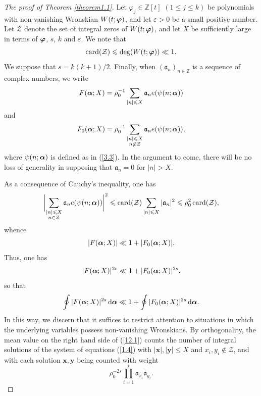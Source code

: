 \documentclass[12pt,reqno]{amsart}
\theoremstyle{definition}
\theoremstyle{remark}
\numberwithin{equation}{section}
\def\bfx{{\mathbf x}}
\def\bfy{{\mathbf y}}
\def\calZ{{\mathcal Z}}
\def\dbZ{{\mathbb Z}}\def\dbQ{{\mathbb Q}}
\def\gra{{\mathfrak a}}\def\grA{{\mathfrak A}}\def\bfgra{{\boldsymbol \gra}}
\def\eps{\varepsilon}
\def\le{\leqslant} \def\ge{\geqslant} \def\pleq{\preccurlyeq} \def\ple{\prec}
\def\d{{\,{\rm d}}}
\begin{document}
\begin{proof}[The proof of Theorem \ref{theorem1.1}] Let $\varphi_j\in \dbZ[t]$ 
$(1\le j\le k)$ be polynomials with non-vanishing Wronskian $W(t;{\boldsymbol \varphi})$, and let 
$\eps>0$ be a small positive number. Let $\calZ$ denote the set of integral zeros of 
$W(t;{\boldsymbol \varphi})$, and let $X$ be sufficiently large in terms of ${\boldsymbol \varphi}$, $s$, $k$ and 
$\eps$. We note that
$$\text{card}(\calZ)\le \text{deg}(W(t;\bfvarphi))\ll 1.$$
We suppose that $s=k(k+1)/2$. Finally, when $(\gra_n)_{n\in \dbZ}$ is a 
sequence of complex numbers, we write
$$F(\bfalp;X)=\rho_0^{-1}\sum_{|n|\le X}\gra_ne(\psi(n;\bfalp))$$
and
$$F_0(\bfalp;X)=\rho_0^{-1}\sum_{\substack{|n|\le X\\ n\not\in \calZ}}\gra_n
e(\psi(n;\bfalp)),$$
where $\psi(n;{\boldsymbol \alpha})$ is defined as in (\ref{3.3}). In the argument to come, there will be 
no loss of generality in supposing that $\gra_n=0$ for $|n|>X$.\par

As a consequence of Cauchy's inequality, one has
$$\biggl| \sum_{\substack{|n|\le X\\ n\in \calZ}}\gra_n e(\psi(n;\bfalp))\biggr|^2\le 
\text{card}(\calZ)\sum_{|n|\le X}|\gra_n|^2\le \rho_0^2\,\text{card}(\calZ),$$
whence
$$|F({\boldsymbol \alpha};X)|\ll 1+|F_0({\boldsymbol \alpha};X)|.$$
Thus, one has
$$|F({\boldsymbol \alpha};X)|^{2s}\ll 1+|F_0({\boldsymbol \alpha};X)|^{2s},$$
so that
\begin{equation}\label{12.1}
\oint |F(\bfalp;X)|^{2s}\d\bfalp \ll 1+\oint |F_0(\bfalp;X)|^{2s}\d\bfalp .
\end{equation}
In this way, we discern that it suffices to restrict attention to situations in which the 
underlying variables possess non-vanishing Wronskians. By orthogonality, the mean value on 
the right hand side of (\ref{12.1}) counts the number of integral solutions of the system of 
equations (\ref{1.4}) with $|\bfx|,|\bfy|\le X$ and $x_i,y_i\not\in \calZ$, and with each 
solution $\bfx,\bfy$ being counted with weight
\begin{equation}\label{12.2}
\rho_0^{-2s}\prod_{i=1}^s\gra_{x_i}{\overline \gra_{y_i}}.
\end{equation}


\end{proof}
\end{document}
